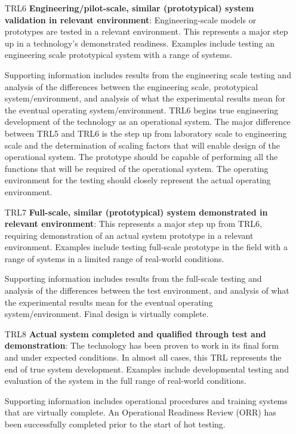 \documentclass[10pt,twocolumn]{article}
\begin{document}
\begin{enumerate}
    \item[\footnotesize TRL6] \textbf{Engineering/pilot-scale, similar (prototypical) system validation in relevant environment}: Engineering-scale models or prototypes are tested in a relevant environment. This represents a major step up in a technology's demonstrated readiness. Examples include testing an engineering scale prototypical system with a range of systems. 
    
    Supporting information includes results from the engineering scale testing and analysis of the differences between the engineering scale, prototypical system/environment, and analysis of what the experimental results mean for the eventual operating system/environment. TRL6 begins true engineering development of the technology as an operational system. The major difference between TRL5 and TRL6 is the step up from laboratory scale to engineering scale and the determination of scaling factors that will enable design of the operational system. The prototype should be capable of performing all the functions that will be required of the operational system. The operating environment for the testing should closely represent the actual operating environment.
    
    \item[\footnotesize TRL7] \textbf{Full-scale, similar (prototypical) system demonstrated in relevant environment}: This represents a major step up from TRL6, requiring demonstration of an actual system prototype in a relevant environment. Examples include testing full-scale prototype in the field with a range of systems in a limited range of real-world conditions. 
    
    Supporting information includes results from the full-scale testing and analysis of the differences between the test environment, and analysis of what the experimental results mean for the eventual operating system/environment. Final design is virtually complete.
    
    \item[\footnotesize TRL8] \textbf{Actual system completed and qualified through test and demonstration}: The technology has been proven to work in its final form and under expected conditions. In almost all cases, this TRL represents the end of true system development. Examples include developmental testing and evaluation of the system in the full range of real-world conditions. 
    
    Supporting information includes operational procedures and training systems that are virtually complete. An Operational Readiness Review (ORR) has been successfully completed prior to the start of hot testing.
    

\end{enumerate}
\end{document}
